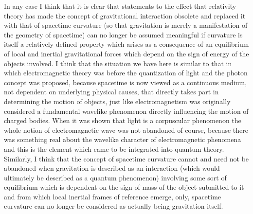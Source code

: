 \documentclass[notitlepage,12pt]{report}
\begin{document}
In any case I think that it is clear that statements to the effect that relativity theory has made the concept of gravitational interaction obsolete and replaced it with that of spacetime curvature (so that gravitation is merely a manifestation of the geometry of spacetime) can no longer be assumed meaningful if curvature is itself a relatively defined property which arises as a consequence of an equilibrium of local and inertial gravitational forces which depend on the sign of energy of the objects involved. I think that the situation we have here is similar to that in which electromagnetic theory was before the quantization of light and the photon concept was proposed, because spacetime is now viewed as a continuous medium, not dependent on underlying physical causes, that directly takes part in determining the motion of objects, just like electromagnetism was originally considered a fundamental wavelike phenomenon directly influencing the motion of charged bodies. When it was shown that light is a corpuscular phenomenon the whole notion of electromagnetic wave was not abandoned of course, because there was something real about the wavelike character of electromagnetic phenomena and this is the element which came to be integrated into quantum theory. Similarly, I think that the concept of spacetime curvature cannot and need not be abandoned when gravitation is described as an interaction (which would ultimately be described as a quantum phenomenon) involving some sort of equilibrium which is dependent on the sign of mass of the object submitted to it and from which local inertial frames of reference emerge, only, spacetime curvature can no longer be considered as actually being gravitation itself.
\end{document}
